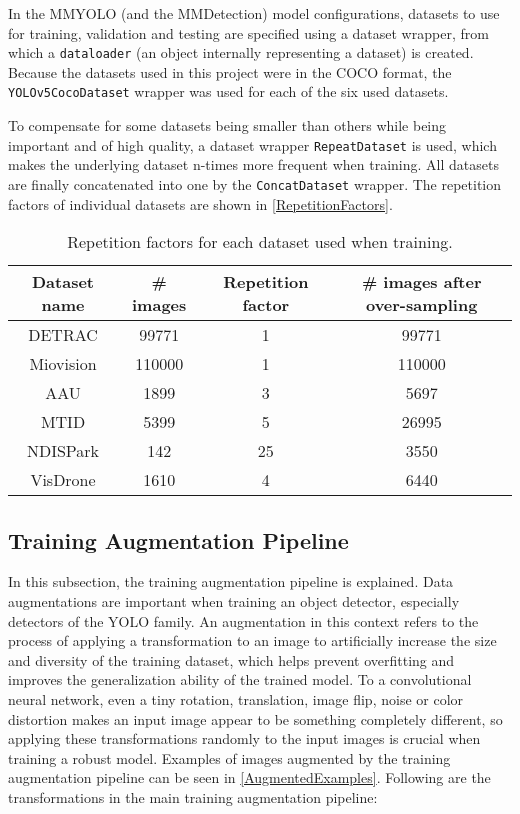 In the MMYOLO (and the MMDetection) model configurations, datasets to use for
training, validation and testing are specified using a dataset wrapper, from
which a \texttt{dataloader} (an object internally representing a dataset) is
created. Because the datasets used in this project were in the COCO format, the
\texttt{YOLOv5CocoDataset} wrapper was used for each of the six used datasets.

To compensate for some datasets being smaller than others while being important
and of high quality, a dataset wrapper \texttt{RepeatDataset} is used, which
makes the underlying dataset n-times more frequent when training. All datasets are finally
concatenated into one by the \texttt{ConcatDataset} wrapper. The repetition
factors of individual datasets are shown in \autoref{RepetitionFactors}.

\begin{table}[h]
\centering
\small
\begin{tabular}{|c|c|c|c|}
    \hline
    Dataset name & \# images & Repetition factor & \# images after over-sampling \\
    \hline
    DETRAC       &  \num{99771} &  1 & \num{99771} \\
    Miovision    & \num{110000} &  1 & \num{110000} \\
    AAU          &   \num{1899} &  3 & \num{5697} \\
    MTID         &   \num{5399} &  5 & \num{26995} \\
    NDISPark     &    \num{142} & 25 & \num{3550} \\
    VisDrone     &   \num{1610} &  4 & \num{6440} \\
    \hline
\end{tabular}
\caption{Repetition factors for each dataset used when training.}
\label{RepetitionFactors}
\end{table}



\subsection{Training Augmentation Pipeline}

In this subsection, the training augmentation pipeline is explained. Data
augmentations are important when training an object detector, especially
detectors of the YOLO family. An augmentation in this context refers to the
process of applying a transformation to an image to artificially increase the
size and diversity of the training dataset, which helps prevent overfitting and
improves the generalization ability of the trained model. To a convolutional
neural network, even a tiny rotation, translation, image flip, noise or color
distortion makes an input image appear to be something completely different, so
applying these transformations randomly to the input images is crucial when
training a robust model. Examples of images augmented by the training
augmentation pipeline can be seen in \autoref{AugmentedExamples}. Following are
the transformations in the main training augmentation pipeline:


